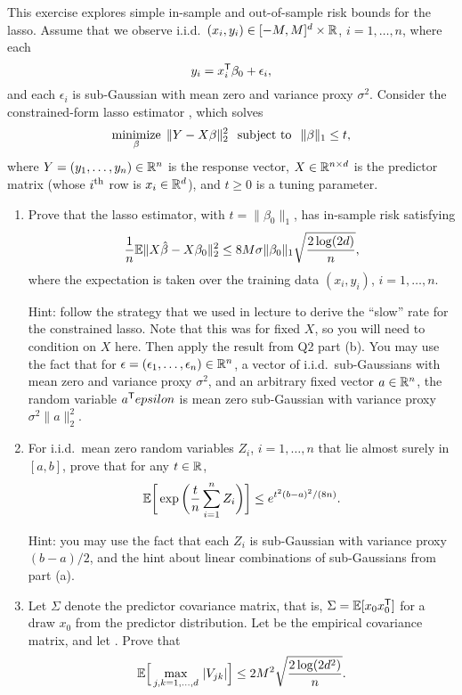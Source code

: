 \documentclass{article}
\begin{document}
\def\hSigma{\hat\Sigma}

This exercise explores simple in-sample and out-of-sample risk bounds for the
lasso. Assume that we observe i.i.d.\ $(x_i,y_i) \in [-M,M]^d \times \mathbb{R}$,
$i=1,\dots,n$, where each   
\[
y_i = x_i^{\mathsf{T}} \beta_0 + \epsilon_i,
\]
and each $\epsilon_i$ is sub-Gaussian with mean zero and variance proxy
$\sigma^2$. Consider the constrained-form lasso estimator \smash{$\hbeta$}, 
which solves  
\[
\mathop{\mathrm{minimize}}_\beta \; \|Y - X\beta\|_2^2 \;\; \mathop{\mathrm{subject\,\,to}} \;\; \|\beta\|_1 \leq t,    
\]
where $Y = (y_1,\dots,y_n) \in \mathbb{R}^n$ is the response vector, $X \in \mathbb{R}^{n \times
  d}$ is the predictor matrix (whose $i^{\text{th}}$ row is $x_i \in \mathbb{R}^d$), and $t \geq
0$ is a tuning parameter.

\begin{enumerate}[label=(\alph*)]
\item Prove that the lasso estimator, with $t=\|\beta_0\|_1$, has in-sample risk
  satisfying 
  \marginpar{\small [3 pts]}
  \[
  \frac{1}{n} \mathbb{E} \|X\hat{\beta} - X\beta_0\|_2^2 \leq 8M \sigma \|\beta_0\|_1
  \sqrt{\frac{2 \log(2d)}{n}},  
  \]
  where the expectation is taken over the training data $(x_i,y_i)$,
  $i=1,\dots,n$. 

  Hint: follow the strategy that we used in lecture to derive the ``slow'' rate 
  for the constrained lasso. Note that this was for fixed $X$, so you will need
  to condition on $X$ here. Then apply the result from Q2 part (b). You may use
  the fact that for $\epsilon = (\epsilon_1,\dots,\epsilon_n) \in \mathbb{R}^n$, a
  vector of i.i.d.\ sub-Gaussians with mean zero and variance proxy $\sigma^2$,
  and an arbitrary fixed vector $a \in \mathbb{R}^n$, the random variable $a^{\mathsf{T}} epsilon$
  is mean zero sub-Gaussian with variance proxy $\sigma^2 \|a\|_2^2$. 

\item For i.i.d.\ mean zero random variables $Z_i$, $i=1,\dots,n$ that lie
  almost surely in $[a,b]$, prove that for any $t \in \mathbb{R}$, 
  \marginpar{\small [2 pts]}
  \[
  \mathbb{E} \bigg[\exp \bigg(\frac{t}{n} \sum_{i=1}^n Z_i \bigg)\bigg] \leq
  e^{t^2(b-a)^2/(8n)}.  
  \]

  Hint: you may use the fact that each $Z_i$ is sub-Gaussian with variance proxy
  $(b-a)/2$, and the hint about linear combinations of sub-Gaussians from part
  (a).  

\item Let $\Sigma$ denote the predictor covariance matrix, that is,
  $\Sigma = \mathbb{E}[x_0x_0^{\mathsf{T}}]$ for a draw $x_0$ from the predictor distribution. Let
  \smash{$\hSigma = X^\T X/n$} be the empirical covariance matrix, and let
  \smash{$V = \hSigma-\Sigma$}. Prove that    
  \marginpar{\small [2 pts]}
  \[
  \mathbb{E}\Big[ \max_{j,k=1,\dots,d} \, |V_{jk}| \Big] \leq 2M^2 \sqrt{\frac{2
      \log(2d^2)}{n}}.  
  \]


\end{enumerate}
\end{document}
